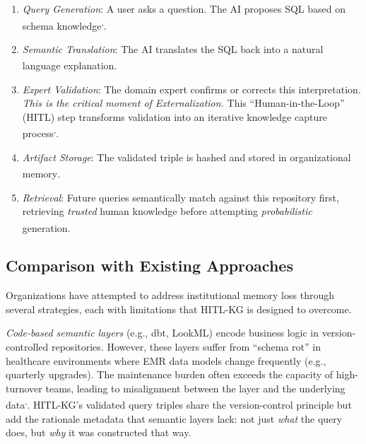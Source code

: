 \documentclass[
  american,
  11pt,
  letterpaper,
  oneside  ,captions=tableheading
]{scrartcl}
\providecommand{\tightlist}{%
  \setlength{\itemsep}{0pt}\setlength{\parskip}{0pt}}
\begin{document}
\begin{enumerate}
\def\labelenumi{\arabic{enumi}.}
\tightlist
\item
  \emph{Query Generation}: A user asks a question. The AI proposes SQL
  based on schema
  knowledge\textsuperscript{,}.
\item
  \emph{Semantic Translation}: The AI translates the SQL back into a
  natural language
  explanation\textsuperscript{}.
\item
  \emph{Expert Validation}: The domain expert confirms or corrects this
  interpretation. \emph{This is the critical moment of Externalization.}
  This ``Human-in-the-Loop'' (HITL) step transforms validation into an
  iterative knowledge capture
  process\textsuperscript{,}.
\item
  \emph{Artifact Storage}: The validated triple is hashed and stored in
  organizational memory\textsuperscript{}.
\item
  \emph{Retrieval}: Future queries semantically match against this
  repository first, retrieving \emph{trusted} human knowledge before
  attempting \emph{probabilistic}
  generation\textsuperscript{}.
\end{enumerate}

\subsection{Comparison with Existing
Approaches}\label{comparison-with-existing-approaches}

Organizations have attempted to address institutional memory loss
through several strategies, each with limitations that HITL-KG is
designed to overcome.

\emph{Code-based semantic layers} (e.g., dbt, LookML) encode business
logic in version-controlled repositories. However, these layers suffer
from ``schema rot'' in healthcare environments where EMR data models
change frequently (e.g., quarterly upgrades). The maintenance burden
often exceeds the capacity of high-turnover teams, leading to
misalignment between the layer and the underlying
data\textsuperscript{,}.
HITL-KG's validated query triples share the version-control principle
but add the rationale metadata that semantic layers lack: not just
\emph{what} the query does, but \emph{why} it was constructed that way.
\end{document}
